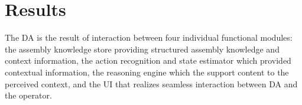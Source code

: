 \section{Results}\label{sec:Results}

The DA is the result of interaction between four individual functional modules: the assembly knowledge store providing structured assembly knowledge and context information, the action recognition and state estimator which provided contextual information, the reasoning engine which the support content to the perceived context, and the UI that realizes seamless interaction between DA and the operator.





